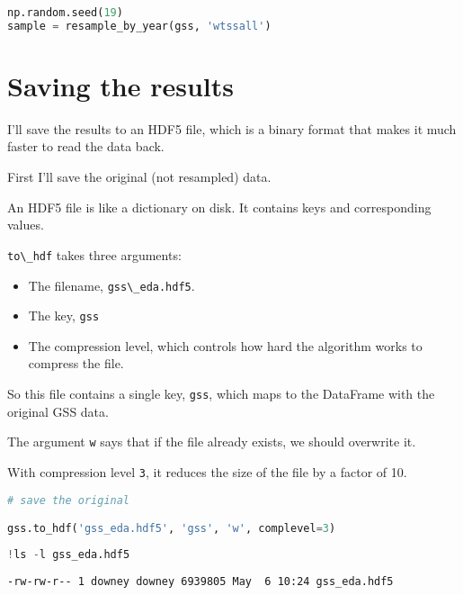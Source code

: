\begin{lstlisting}[language=Python]
np.random.seed(19)
sample = resample_by_year(gss, 'wtssall')
\end{lstlisting}

\hypertarget{saving-the-results}{%
\section{Saving the results}\label{saving-the-results}}

I'll save the results to an HDF5 file, which is a binary format that
makes it much faster to read the data back.

First I'll save the original (not resampled) data.

An HDF5 file is like a dictionary on disk. It contains keys and
corresponding values.

\passthrough{\lstinline!to\_hdf!} takes three arguments:

\begin{itemize}
\item
  The filename, \passthrough{\lstinline!gss\_eda.hdf5!}.
\item
  The key, \passthrough{\lstinline!gss!}
\item
  The compression level, which controls how hard the algorithm works to
  compress the file.
\end{itemize}

So this file contains a single key, \passthrough{\lstinline!gss!}, which
maps to the DataFrame with the original GSS data.

The argument \passthrough{\lstinline!w!} says that if the file already
exists, we should overwrite it.

With compression level \passthrough{\lstinline!3!}, it reduces the size
of the file by a factor of 10.

\begin{lstlisting}[language=Python]
# save the original

gss.to_hdf('gss_eda.hdf5', 'gss', 'w', complevel=3)
\end{lstlisting}

\begin{lstlisting}[language=Python]
!ls -l gss_eda.hdf5
\end{lstlisting}

\begin{lstlisting}[]
-rw-rw-r-- 1 downey downey 6939805 May  6 10:24 gss_eda.hdf5
\end{lstlisting}

